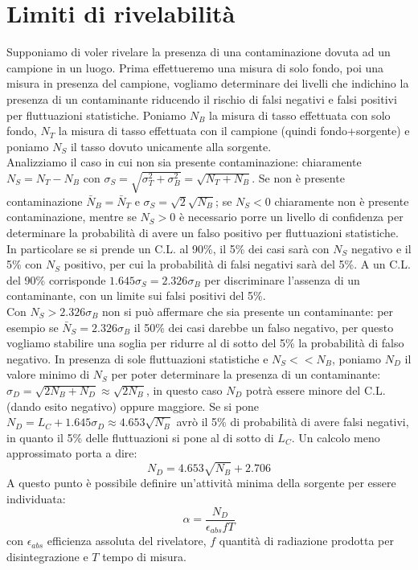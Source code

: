 \section{Limiti di rivelabilit\`a}
Supponiamo di voler rivelare la presenza di una contaminazione dovuta ad un campione in un luogo.
Prima effettueremo una misura di solo fondo, poi una misura in presenza del campione, vogliamo determinare dei livelli che indichino la presenza
di un contaminante riducendo il rischio di falsi negativi e falsi positivi per fluttuazioni statistiche.
Poniamo $N_B$ la misura di tasso effettuata con solo fondo, $N_T$ la misura di tasso effettuata con il campione (quindi fondo+sorgente) e
poniamo $N_S$ il tasso dovuto unicamente alla sorgente.\\
Analizziamo il caso in cui non sia presente contaminazione: chiaramente $N_S = N_T - N_B$ con $\sigma_{S} = \sqrt{\sigma_{T}^2 + \sigma_{B}^2} = \sqrt{N_{T} + N_{B}}$.
Se non \`e presente contaminazione $\bar{N}_B = \bar{N}_T$  e $\sigma_{S}=\sqrt{2} \sqrt{N_B}$; se $N_S<0$ chiaramente non \`e presente
contaminazione, mentre se $N_S>0$ \`e necessario porre un livello di confidenza per determinare la probabilit\`a di avere un falso positivo per fluttuazioni statistiche.
In particolare se si prende un C.L. al 90\%, il 5\% dei casi sar\`a con $N_S$ negativo e il 5\% con $N_S$ positivo, per cui la probabilit\`a
di falsi negativi sar\`a del 5\%.
A un C.L. del 90\% corrisponde $1.645\sigma_S = 2.326\sigma_B$ per discriminare l'assenza di un contaminante, con un limite sui falsi positivi del 5\%.\\
Con $N_S>2.326\sigma_B$ non si pu\`o affermare che sia presente un contaminante:
per esempio se $\bar{N}_S=2.326\sigma_B$ il 50\% dei casi darebbe un falso negativo, per questo vogliamo stabilire una soglia per ridurre al di sotto del 5\% la probabilit\`a di falso negativo.
In presenza di sole fluttuazioni statistiche e $N_S<<N_B$, poniamo $N_D$ il valore minimo di $N_S$ per poter determinare la presenza di un contaminante:
$\sigma_D = \sqrt{2 N_B+N_D} \approx \sqrt{2 N_B}$, in questo caso $N_D$ potr\`a essere minore del C.L. (dando esito negativo) oppure maggiore.
Se si pone $N_D = L_C + 1.645\sigma_D \approx 4.653 \sqrt{N_B}$ avr\`o il 5\% di probabilit\`a di avere falsi negativi, in quanto
il 5\% delle fluttuazioni si pone al di sotto di $L_C$. 
Un calcolo meno approssimato porta a dire:
\begin{equation*}
N_D = 4.653 \sqrt{N_B} + 2.706
\end{equation*}
A questo punto \`e possibile definire un'attivit\`a minima della sorgente per essere individuata:
\begin{equation*}
\alpha = \frac{N_D } {\epsilon_{abs} f T}
\end{equation*}
con $\epsilon_{abs}$ efficienza assoluta del rivelatore, $f$ quantit\`a di radiazione prodotta per disintegrazione e $T$ tempo di misura.
